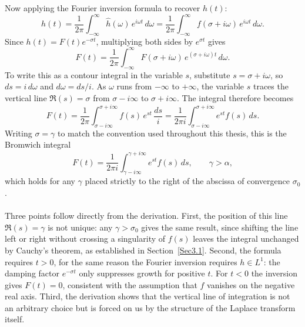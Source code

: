Now applying the Fourier inversion formula to recover $h(t)$:
\begin{equation}
    h(t) = \frac{1}{2\pi} \int_{-\infty}^{\infty}
    \hat{h}(\omega)\, e^{i\omega t}\, d\omega
    = \frac{1}{2\pi} \int_{-\infty}^{\infty}
    f(\sigma + i\omega)\, e^{i\omega t}\, d\omega.
\end{equation}
Since $h(t) = F(t)e^{-\sigma t}$, multiplying both sides by $e^{\sigma t}$ gives
\begin{equation}
    F(t) = \frac{1}{2\pi} \int_{-\infty}^{\infty}
    F(\sigma + i\omega)\, e^{(\sigma + i\omega)t}\, d\omega.
\end{equation}
To write this as a contour integral in the variable $s$, substitute
$s = \sigma + i\omega$, so $ds = i\,d\omega$ and $d\omega = ds/i$.
As $\omega$ runs from $-\infty$ to $+\infty$, the variable $s$ traces the
vertical line $\mathfrak{R}(s) = \sigma$ from $\sigma - i\infty$ to
$\sigma + i\infty$. The integral therefore becomes
\begin{equation}
    F(t) = \frac{1}{2\pi} \int_{\sigma - i\infty}^{\sigma + i\infty}
    f(s)\, e^{st}\, \frac{ds}{i}
    = \frac{1}{2\pi i}
    \int_{\sigma - i\infty}^{\sigma + i\infty} e^{st} f(s)\, ds.
\end{equation}
Writing $\sigma = \gamma$ to match the convention used throughout this thesis,
this is the Bromwich integral
\begin{equation}\label{eq:bromwich}
    F(t) = \frac{1}{2\pi i}
    \int_{\gamma - i\infty}^{\gamma + i\infty} e^{st} f(s)\, ds,
    \qquad \gamma > \alpha,
\end{equation}
which holds for any $\gamma$ placed strictly to the right of the abscissa of
convergence $\sigma_{0}$. \cite{RedBook, YellowBook, TransformsTheory}
\\
\\
Three points follow directly from the derivation. First, the position of this
line $\mathfrak{R}(s) = \gamma$ is not unique: any $\gamma > \sigma_{0}$
gives the same result, since shifting the line left or right without crossing
a singularity of $f(s)$ leaves the integral unchanged by Cauchy's theorem,
as established in Section~\ref{Sec3.1}. Second, the formula requires
$t > 0$, for the same reason the Fourier inversion requires $h \in L^{1}$:
the damping factor $e^{-\sigma t}$ only suppresses growth for positive $t$.
For $t < 0$ the inversion gives $F(t) = 0$, consistent with the assumption
that $f$ vanishes on the negative real axis. Third, the derivation shows that
the vertical line of integration is not an arbitrary choice but is forced on
us by the structure of the Laplace transform itself.















